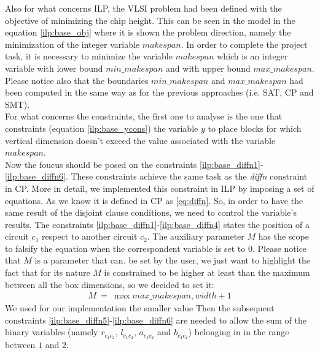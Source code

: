     Also for what concerns ILP, the VLSI problem had been defined with the objective of minimizing 
    the chip height. This can be seen in the model in the equation \ref{ilp:base_obj} where it is
    shown the problem direction, namely the minimization of the integer variable \(makespan\).
    In order to complete the project task, it is necessary to minimize the variable \(makespan\) which
    is an integer variable with lower bound \(min\_makespan\) and with upper bound \(max\_makespan\).
    Please notice also that the boundaries \(min\_makespan\) and \(max\_makespan\) had been computed
    in the same way as for the previous approaches (i.e. SAT, CP and SMT).\\

    For what concerns the constraints, the first one to analyse is the one that constraints
    (equation \ref{ilp:base_ycons}) the variable \(y\) to place blocks for which vertical dimension
    doesn't exceed the value associated with the variable \(makespan\).\\

    Now the foucus should be posed on the constraints \ref{ilp:base_diffn1}-\ref{ilp:base_diffn6}.
    These constraints achieve the same task as the \textit{diffn} constraint in CP. More in
    detail, we implemented this constraint in ILP by imposing a set of equations. As we know
    it is defined in CP as \ref{eq:diffn}. So, in order to have the same result of the disjoint
    clause conditions, we need to control the variable's results. The constraints 
    \ref{ilp:base_diffn1}-\ref{ilp:base_diffn4} states the position of a circuit \(c_1\) respect to
    another circuit \(c_2\). The auxiliary parameter \(M\) has the scope to falsify the equation
    when the correspondent variable is set to 0. Please notice that \(M\) is a parameter that can.
    be set by the user, we just want to highlight the fact that for its nature \(M\) is constrained
    to be higher at least than the maximum between all the box dimensions, so we decided to set it:
    \begin{align*}
        M\ =\ \max{max\_makespan, width} + 1 
    \end{align*}
    We used for our implementation the smaller value Then the subsequent constraints 
    \ref{ilp:base_diffn5}-\ref{ilp:base_diffn6} are needed to allow the sum of the binary variables 
    (namely \(r_{c_1c_2}\), \(l_{c_1c_2}\), \(a_{c_1c_2}\) and \(b_{c_1c_2}\)) belonging in in the range
    between \(1\) and \(2\). \\
    
